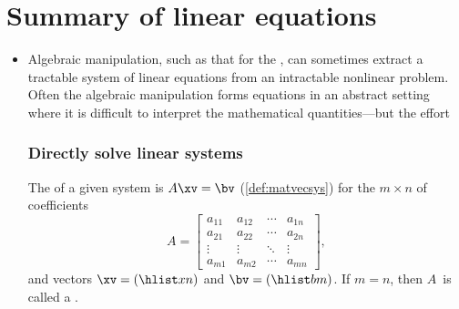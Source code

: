 
\section{Summary of linear equations}
\label{sec:sumle}

\begin{itemize}
\def\index#1{}%

\subsubsection{Introduction to systems of linear equations}


\itemhi A  in the \(n\)~variables \(x_1,x_2,\ldots,x_n\) is an equation that can be written in the form (\cref{def:lineqn})
\begin{equation*}
\lincomb axn=b\,.
\end{equation*}
A  of linear equations is a set of one or more linear equations in one or more variables.


\item Algebraic manipulation, such as that for the \gps, can sometimes extract a tractable system of linear equations from an intractable nonlinear problem.
Often the algebraic manipulation forms equations in an abstract setting where it is difficult to interpret the mathematical quantities---but the effort 



\subsubsection{Directly solve linear systems}

\itemme The  of a given system is \(A\xv=\bv\) (\cref{def:matvecsys}) for the \(m\times n\)  of coefficients
\begin{equation*}
A=\begin{bmatrix} a_{11}&a_{12}&\cdots&a_{1n}
\\a_{21}&a_{22}&\cdots&a_{2n}
\\\vdots&\vdots&\ddots&\vdots
\\a_{m1}&a_{m2}&\cdots&a_{mn} \end{bmatrix},
\end{equation*}
and vectors \(\xv=(\hlist xn)\) and \(\bv=(\hlist bm)\).
If \(m=n\), then \(A\)~is called a .


\end{itemize}
